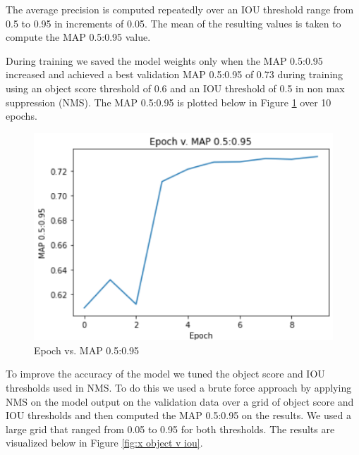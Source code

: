 \documentclass{article}
\begin{document}
\begin{minipage}{1\textwidth}%
The average precision is computed repeatedly over an IOU threshold range from 0.5 to 0.95 in increments of 0.05.  The mean of the resulting values is taken to compute the MAP 0.5:0.95 value. \\
\end{minipage}%

\noindent During training we saved the model weights only when the MAP 0.5:0.95 increased and achieved a best validation MAP 0.5:0.95 of 0.73 during training using an object score threshold of 0.6 and an IOU threshold of 0.5 in non max suppression (NMS).  The MAP 0.5:0.95 is plotted below in Figure \ref{fig:x epoch_v_map} over 10 epochs. 

\begin{figure}[h]
\centering
	\includegraphics[scale=0.7]{final-report-images/epoch_v_map.png}
\caption{Epoch vs. MAP 0.5:0.95}
\label{fig:x epoch_v_map}
\end{figure}

To improve the accuracy of the model we tuned the object score and IOU thresholds used in NMS.  To do this we used a brute force approach by applying NMS on the model output on the validation data over a grid of object score and IOU thresholds and then computed the MAP 0.5:0.95 on the results.  We used a large grid that ranged from 0.05 to 0.95 for both thresholds.  The results are visualized below in Figure \ref{fig:x object v iou}.  
\end{document}
